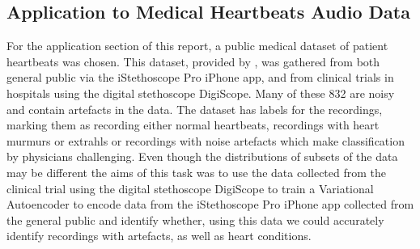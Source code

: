 \documentclass[12pt]{article}
\begin{document}







\newpage

\subsection{Application to Medical Heartbeats Audio Data}
For the application section of this report, a public medical dataset of patient heartbeats was chosen. This dataset, provided by \citet{pascal-chsc-2011}, was gathered from both general public via the iStethoscope Pro iPhone app, and from clinical trials in hospitals using the digital stethoscope DigiScope. Many of these 832 are noisy and contain artefacts in the data. The dataset has labels for the recordings, marking them as recording either normal heartbeats, recordings with heart murmurs or extrahls or recordings with noise artefacts which make classification by physicians challenging. Even though the distributions of subsets of the data may be different the aims of this task was to use the data collected from the clinical trial using the digital stethoscope DigiScope to train a Variational Autoencoder to encode data from the iStethoscope Pro iPhone app collected from the general public and identify whether, using this data we could accurately identify recordings with artefacts, as well as heart conditions.  
\end{document}
